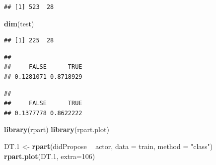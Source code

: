 \documentclass[
]{article}
\newenvironment{Shaded}{\begin{snugshade}}{\end{snugshade}}
\newcommand{\DataTypeTok}[1]{\textcolor[rgb]{0.13,0.29,0.53}{#1}}
\newcommand{\DecValTok}[1]{\textcolor[rgb]{0.00,0.00,0.81}{#1}}
\newcommand{\FloatTok}[1]{\textcolor[rgb]{0.00,0.00,0.81}{#1}}
\newcommand{\KeywordTok}[1]{\textcolor[rgb]{0.13,0.29,0.53}{\textbf{#1}}}
\newcommand{\NormalTok}[1]{#1}
\newcommand{\OperatorTok}[1]{\textcolor[rgb]{0.81,0.36,0.00}{\textbf{#1}}}
\newcommand{\StringTok}[1]{\textcolor[rgb]{0.31,0.60,0.02}{#1}}
\begin{document}
\begin{verbatim}
## [1] 523  28
\end{verbatim}

\begin{Shaded}
\begin{Highlighting}[]
\KeywordTok{dim}\NormalTok{(test)}
\end{Highlighting}
\end{Shaded}

\begin{verbatim}
## [1] 225  28
\end{verbatim}

\begin{Shaded}
\end{Shaded}

\begin{verbatim}
## 
##     FALSE      TRUE 
## 0.1281071 0.8718929
\end{verbatim}

\begin{Shaded}
\end{Shaded}

\begin{verbatim}
## 
##     FALSE      TRUE 
## 0.1377778 0.8622222
\end{verbatim}

\begin{Shaded}
\begin{Highlighting}[]
\KeywordTok{library}\NormalTok{(rpart)}
\KeywordTok{library}\NormalTok{(rpart.plot)}

\NormalTok{DT}\FloatTok{.1}\NormalTok{ <-}\StringTok{ }\KeywordTok{rpart}\NormalTok{(didPropose }\OperatorTok{~}\StringTok{ }\NormalTok{actor, }\DataTypeTok{data =}\NormalTok{ train, }\DataTypeTok{method =} \StringTok{"class"}\NormalTok{)}
\KeywordTok{rpart.plot}\NormalTok{(DT}\FloatTok{.1}\NormalTok{, }\DataTypeTok{extra=}\DecValTok{106}\NormalTok{)}
\end{Highlighting}
\end{Shaded}
\end{document}
